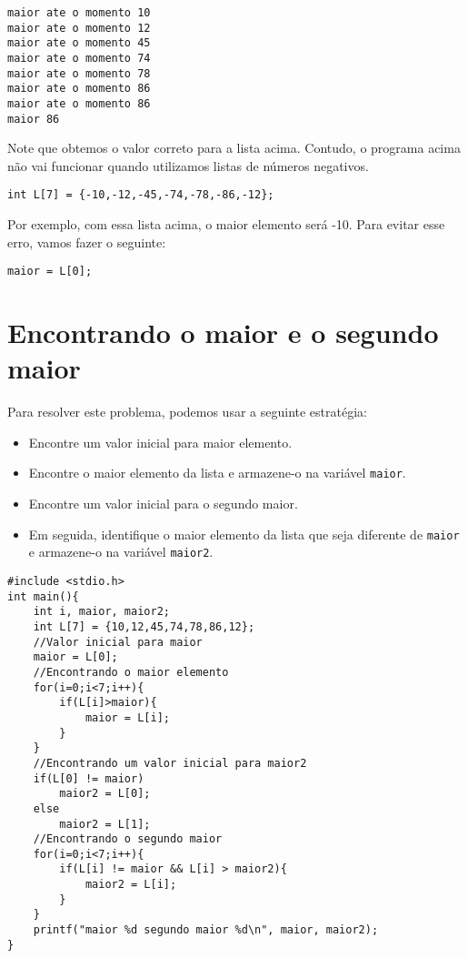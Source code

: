\documentclass[a4paper,11pt]{article}
\begin{document}
\begin{verbatim}
maior ate o momento 10
maior ate o momento 12
maior ate o momento 45
maior ate o momento 74
maior ate o momento 78
maior ate o momento 86
maior ate o momento 86
maior 86

\end{verbatim}

Note que obtemos o valor correto para a lista acima. Contudo, o programa acima não vai funcionar quando utilizamos listas de números negativos.


\begin{verbatim}
int L[7] = {-10,-12,-45,-74,-78,-86,-12};
\end{verbatim}

Por exemplo, com essa lista acima, o maior elemento será -10. Para evitar esse erro, vamos fazer o seguinte:

\begin{verbatim}
maior = L[0];
\end{verbatim}

\section*{Encontrando o maior e o segundo maior}

Para resolver este problema, podemos usar a seguinte estratégia:

\begin{itemize}
    \item Encontre um valor inicial para maior elemento.
    \item Encontre o maior elemento da lista e armazene-o na variável \texttt{maior}.
    \item Encontre um valor inicial para o segundo maior.
    \item Em seguida, identifique o maior elemento da lista que seja diferente de \texttt{maior} e armazene-o na variável \texttt{maior2}.
\end{itemize}


\begin{verbatim}
#include <stdio.h>
int main(){
    int i, maior, maior2;
    int L[7] = {10,12,45,74,78,86,12};
    //Valor inicial para maior 
    maior = L[0];
    //Encontrando o maior elemento
    for(i=0;i<7;i++){
        if(L[i]>maior){
            maior = L[i];
        }
    }
    //Encontrando um valor inicial para maior2
    if(L[0] != maior)
        maior2 = L[0];
    else
        maior2 = L[1];
    //Encontrando o segundo maior
    for(i=0;i<7;i++){
        if(L[i] != maior && L[i] > maior2){
            maior2 = L[i];
        }
    }	
    printf("maior %d segundo maior %d\n", maior, maior2);
}
\end{verbatim}
\end{document}
